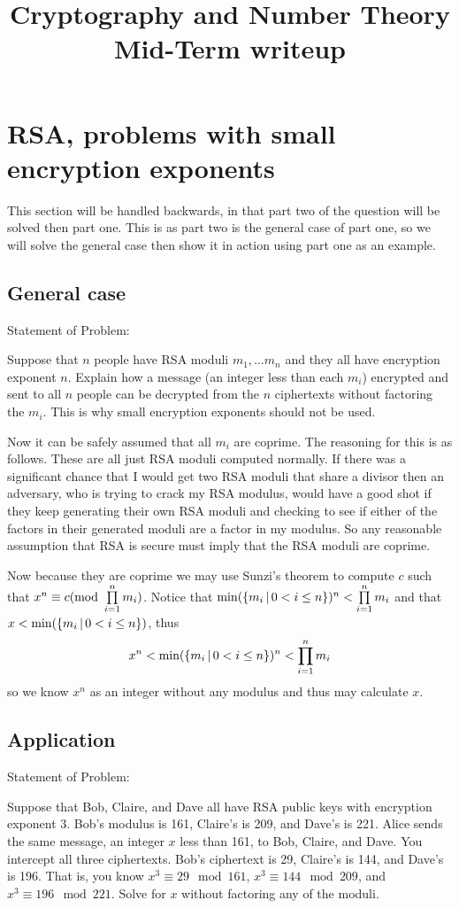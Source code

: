 \documentclass{article}
\title{Cryptography and Number Theory\\Mid-Term writeup}
\begin{document}
	\maketitle
	\section{RSA, problems with small encryption exponents}
	This section will be handled backwards, in that part two of the question will be solved then part one. This is as part two is the general case of part one, so we will solve the general case then show it in action using part one as an example.
	
	\subsection{General case}
	Statement of Problem:
	\begin{displayquote}
		Suppose that $n$ people have RSA moduli $m_1, \ldots m_n$ and they all have encryption exponent $n$. Explain how a message (an integer less than each $m_i$) encrypted and sent to all $n$ people can be decrypted from the $n$ ciphertexts without factoring the $m_i$. This is why small encryption exponents should not be used.
	\end{displayquote}
	
	 Now it can be safely assumed that all $m_i$ are coprime. The reasoning for this is as follows. These are all just RSA moduli computed normally. If there was a significant chance that I would get two RSA moduli that share a divisor then an adversary, who is trying to crack my RSA modulus, would have a good shot if they keep generating their own RSA moduli and checking to see if either of the factors in their generated moduli are a factor in my modulus. So any reasonable assumption that RSA is secure must imply that the RSA moduli are coprime.
	 
	 Now because they are coprime we may use Sunzi's theorem to compute $c$ such that $x^n \equiv c(\text{mod } \prod\limits_{i=1}^{n} {m_i} )$. Notice that $\min(\left\{{m_i} \,\middle|\, {0<i\le n}\right\})^n < \prod\limits_{i=1}^{n} {m_i} $ and that $x < \min(\left\{{m_i} \,\middle|\, {0<i\le n}\right\})$, thus $$x ^ n < \min(\left\{{m_i} \,\middle|\, {0<i\le n}\right\})^n < \prod\limits_{i=1}^{n} {m_i} $$ so we know $x^n$ as an integer without any modulus and thus may calculate $x$.
	 
	 \subsection{Application}
	 Statement of Problem:
	 \begin{displayquote}
	 	Suppose that Bob, Claire, and Dave all have RSA public keys with encryption exponent $3$. Bob's modulus is 161, Claire's is 209, and Dave's is 221. Alice sends the same message, an integer $x$ less than 161, to Bob, Claire, and Dave. You intercept all three ciphertexts. Bob's ciphertext is 29, Claire's is 144, and Dave's is 196. That is, you know $x^3 \equiv 29 \mod 161$, $x^3\equiv 144 \mod 209$, and $x^3 \equiv 196 \mod 221$. Solve for $x$ without factoring any of the moduli.
	 \end{displayquote}
	 
\end{document}

